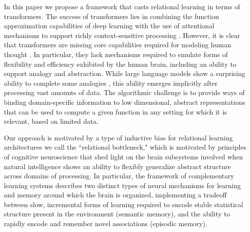 In this paper we propose a framework that casts relational learning in terms of transformers. 
The success of transformers lies in combining the function approximation capabilities of deep learning with the use
of attentional mechanisms to support richly context-sensitive processing \citep{transformers,vaswani2017attention,
    kerg2020untangling}. However, it is clear that transformers are missing core capabilities required for modeling
human thought \citep{mahowald2023dissociating}.  In particular, they lack mechanisms required to emulate forms of
flexibility and efficiency exhibited by the human brain, including an ability to support analogy and abstraction.
While large language models show a surprising ability to complete some analogies \citep{webb}, this ability
emerges implicitly after processing vast amounts of data. The algorithmic challenge is to provide ways of binding
domain-specific information to low dimensional, abstract representations that can be used to compute a given function
in any setting for which it is relevant, based on limited data.

Our approach is motivated by a type of inductive bias for relational learning architectures we call the
``relational bottleneck," which is motivated by principles of cognitive neuroscience that shed light on the brain
subsystems involved when natural intelligence shows an ability to flexibly generalize abstract structure across
domains of processing. In particular, the framework of complementary learning systems \citep{McClelland:1995,
    Kumaran:2016} describes two distinct types of neural mechanisms for learning and memory around which the brain
is organized, implementing a tradeoff between slow, incremental forms of learning required to encode stable statistical
structure present in the environment (semantic memory), and the ability to rapidly encode and remember novel
associations (episodic memory).

